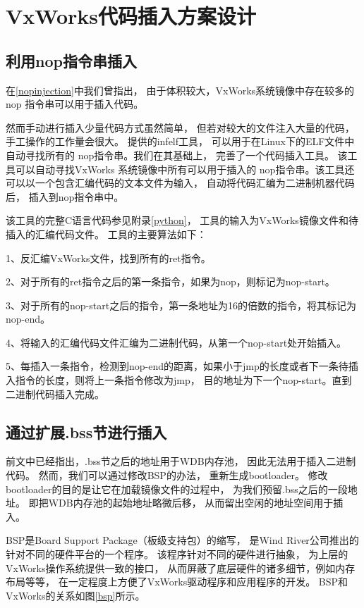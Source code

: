 
\section{VxWorks代码插入方案设计}

\subsection{利用nop指令串插入}

在\ref{nopinjection}中我们曾指出，
由于体积较大，VxWorks系统镜像中存在较多的nop
指令串可以用于插入代码。

然而手动进行插入少量代码方式虽然简单，
但若对较大的文件注入大量的代码，
手工操作的工作量会很大。
\cite{infelf}提供的infelf工具，
可以用于在Linux下的ELF文件中自动寻找所有的
nop指令串。我们在其基础上，
完善了一个代码插入工具。
该工具可以自动寻找VxWorks
系统镜像中所有可以用于插入的
nop指令串。该工具还可以以一个包含汇编代码的文本文件为输入，
自动将代码汇编为二进制机器代码后，
插入到nop指令串中。

该工具的完整C语言代码参见附录\ref{python}，
工具的输入为VxWorks镜像文件和待插入的汇编代码文件。
工具的主要算法如下：

1、反汇编VxWorks文件，找到所有的ret指令。

2、对于所有的ret指令之后的第一条指令，如果为nop，则标记为nop-start。

3、对于所有的nop-start之后的指令，第一条地址为16的倍数的指令，将其标记为nop-end。

4、将输入的汇编代码文件汇编为二进制代码，从第一个nop-start处开始插入。

5、每插入一条指令，检测到nop-end的距离，如果小于jmp的长度或者下一条待插入指令的长度，则将上一条指令修改为jmp，
目的地址为下一个nop-start。直到二进制代码插入完成。



\subsection{通过扩展.bss节进行插入}

前文中已经指出，.bss节之后的地址用于WDB内存池，
因此无法用于插入二进制代码。
然而，我们可以通过修改BSP的办法，
重新生成bootloader。
修改bootloader的目的是让它在加载镜像文件的过程中，
为我们预留.bss之后的一段地址。
即把WDB内存池的起始地址略微后移，
从而留出空闲的地址空间用于插入。

BSP是Board Support Package（板级支持包）的缩写，
是Wind River公司推出的针对不同的硬件平台的一个程序。
该程序针对不同的硬件进行抽象，
为上层的VxWorks操作系统提供一致的接口，
从而屏蔽了底层硬件的诸多细节，例如内存布局等等，
在一定程度上方便了VxWorks驱动程序和应用程序的开发。
BSP和VxWorks的关系如图\ref{bsp}所示。


